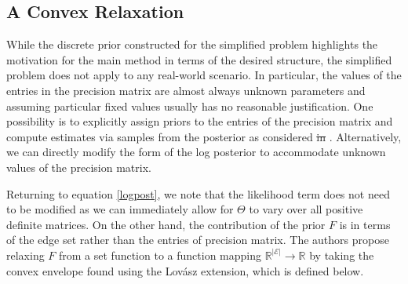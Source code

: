 \documentclass{uwstat572}
\newcommand{\vmdel}[1]{\sout{#1}}
\newcommand{\vmadd}[1]{\textbf{\color{red}{#1}}}
\theoremstyle{remark}
\theoremstyle{definition}
\begin{document}
\subsection{A Convex Relaxation}

While the discrete prior constructed for the simplified problem highlights the motivation for the main method in terms of the desired structure, the simplified problem does not apply to any real-world scenario.  In particular, the values of the entries in the precision matrix are almost always unknown parameters and assuming particular fixed values usually has no reasonable justification.  One possibility is to explicitly assign priors to the entries of the precision matrix and compute estimates via samples from the posterior as considered \vmdel{in} \vmadd{by} \cite{sheridan2010}.  Alternatively, we can directly modify the form of the log posterior to accommodate unknown values of the precision matrix.  

Returning to equation \eqref{logpost}, we note that the likelihood term does not need to be modified as we can immediately allow for $\Theta$ to vary over all positive definite matrices.  On the other hand, the contribution of the prior $F$ is in terms of the edge set rather than the entries of precision matrix.  The authors propose relaxing $F$ from a set function to a function mapping $\mathbb{R}^{|\mathcal{E}|} \to \mathbb{R}$ by taking the convex envelope found using the Lov{\'a}sz extension, which is defined below.
\end{document}

